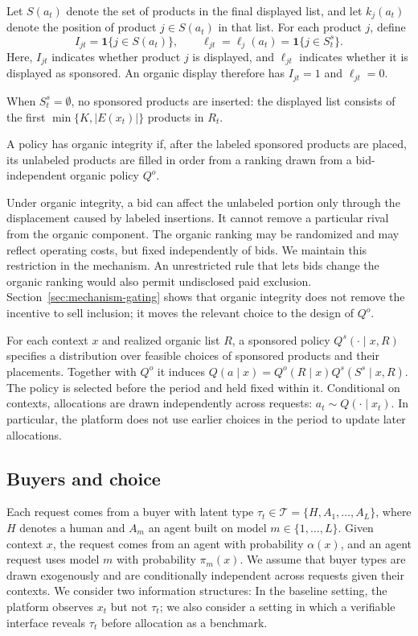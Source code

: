 \documentclass[opre,dblanonrev]{informs4}
\providecommand{\1}{\mathbf{1}}
\begin{document}
Let $S(a_t)$ denote the set of products in the final displayed list,
and let $k_j(a_t)$ denote the position of product $j\in S(a_t)$
in that list. For each product $j$, define
\[
I_{jt}=\mathbf{1}\{j\in S(a_t)\},
\qquad
\ell_{jt}=\ell_j(a_t)=\mathbf{1}\{j\in S_t^s\}.
\]
Here, $I_{jt}$ indicates whether product $j$ is displayed, and
$\ell_{jt}$ indicates whether it is displayed as sponsored.
An organic display therefore has $I_{jt}=1$ and $\ell_{jt}=0$.

When $S_t^s=\emptyset$, no sponsored products are inserted:
the displayed list consists of the first
$\min\{K,|E(x_t)|\}$ products in $R_t$.

\begin{definition}\label{def:organic-integrity}
A policy has organic integrity if, after the labeled sponsored products are placed, its unlabeled products are filled in order from a ranking drawn from a bid-independent organic policy $Q^o$.
\end{definition}

Under organic integrity, a bid can affect the unlabeled portion only through the displacement caused by labeled insertions. It cannot remove a particular rival from the organic component. The organic ranking may be randomized and may reflect operating costs, but fixed independently of bids. We maintain this restriction in the mechanism. An unrestricted rule that lets bids change the organic ranking would also permit undisclosed paid exclusion. Section~\ref{sec:mechanism-gating} shows that organic integrity does not remove the incentive to sell inclusion; it moves the relevant choice to the design of $Q^o$.

For each context $x$ and realized organic list $R$, a sponsored policy $Q^s(\cdot\mid x,R)$ specifies a distribution over feasible
choices of sponsored products and their placements. Together with $Q^o$ it induces $Q(a\mid x)=Q^o(R\mid x)Q^s(S^s\mid x,R)$. The policy is selected before the period and held fixed within it. Conditional on contexts, allocations are drawn independently across requests: $a_t\sim Q(\cdot\mid x_t)$. In particular, the platform does not use earlier choices in the period to update later allocations. 

\subsection{Buyers and choice}\label{sec:model-buyers}

Each request comes from a buyer with latent type $\tau_t\in\mathcal T=\{H,A_1,\ldots,A_L\}$, where $H$ denotes a human and $A_m$ an agent built on model $m\in\{1,\ldots,L\}$. Given context $x$, the request comes from an agent with probability $\alpha(x)$, and an agent request uses model $m$ with probability $\pi_m(x)$. We assume that buyer types are drawn exogenously and are conditionally independent across requests given their contexts. We consider two information structures: In the baseline setting,
the platform observes $x_t$ but not $\tau_t$; we also consider a setting in which a verifiable interface reveals $\tau_t$ before allocation as a benchmark.
\end{document}
